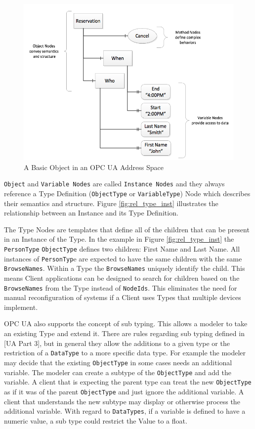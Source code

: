 \begin{figure}[h]
  \centering
  \includegraphics[width=1.0\textwidth]{diagrams/OpcUaBasicObject.png}
  \caption{A Basic Object in an OPC UA Address Space}
  \label{fig:opcua_basic_object}
\end{figure}

\texttt{Object} and \texttt{Variable Nodes} are called \texttt{Instance Nodes} and they always reference a Type Definition (\texttt{ObjectType} or \texttt{VariableType}) Node which describes their semantics and structure. Figure \ref{fig:rel_type_inst} illustrates the relationship between an Instance and its Type Definition.

The Type Nodes are templates that define all of the children that can be present in an Instance of the Type. In the example in Figure \ref{fig:rel_type_inst} the \texttt{PersonType} \texttt{ObjectType} defines two children: First Name and Last Name. All instances of \texttt{PersonTyp}e are expected to have the same children with the same \texttt{BrowseNames}. Within a Type the \texttt{BrowseNames} uniquely identify the child. This means Client applications can be designed to search for children based on the \texttt{BrowseNames} from the Type instead of \texttt{NodeIds}. This eliminates the need for manual reconfiguration of systems if a Client uses Types that multiple devices implement.

OPC UA also supports the concept of sub typing. This allows a modeler to take an existing Type and extend it. There are rules regarding sub typing defined in [UA Part 3], but in general they allow the additions to a given type or the restriction of a \texttt{DataType} to a more specific data type. For example the modeler may decide that the existing \texttt{ObjectType} in some cases needs an additional variable. The modeler can create a subtype of the \texttt{ObjectType} and add the variable. A client that is expecting the parent type can treat the new \texttt{ObjectType} as if it was of the parent \texttt{ObjectType} and just ignore the additional variable. A client that understands the new subtype may display or otherwise process the additional variable. With regard to \texttt{DataTypes}, if a variable is defined to have a numeric value, a sub type could restrict the Value to a float.

